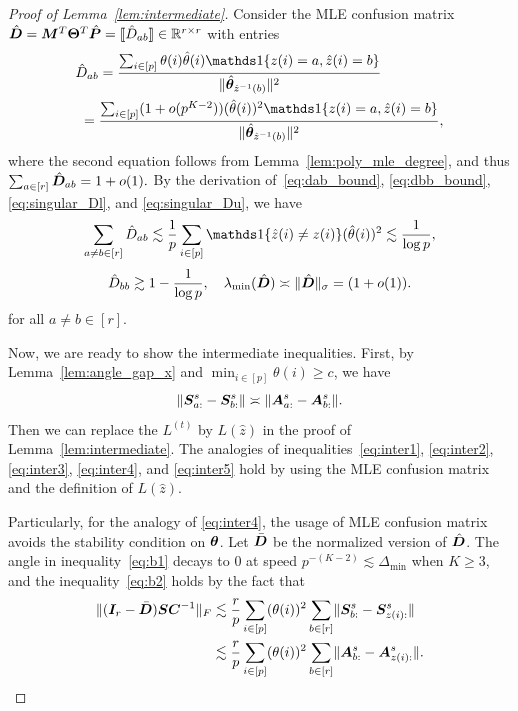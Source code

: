 \documentclass[journal]{IEEEtran}
\theoremstyle{definition}
\theoremstyle{definition}
\begin{document}
\begin{proof}[Proof of Lemma~\ref{lem:intermediate}]
{        Consider the MLE confusion matrix $\hat {\bm{D}} = \bm M^T \boldsymbol{\Theta}^T \hat {\bm{P}} = \llbracket \hat D_{ab} \rrbracket \in \mathbb{R}^{r \times r}$ with entries
        \small
\begin{align}
    &\hat D_{ab}
    = \frac{ \sum_{i \in [p]} \theta(i) \hat \theta(i) \ind\{ z(i) = a, \hat z(i) = b  \} }{\onormSize{}{\hat \mtheta_{\hat z^{-1}(b)}}^2}\\
    &\ = \frac{ \sum_{i \in [p]} (1 + o(p^{K-2}))(\hat \theta(i))^2 \ind\{ z(i) = a, \hat z(i) = b  \} }{\onormSize{}{\hat \mtheta_{\hat z^{-1}(b)}}^2}, \label{eq:mle_confusion}
\end{align}
\normalsize
where the second equation follows from Lemma~\ref{lem:poly_mle_degree}, and thus $\sum_{a \in [r]}\hat {\bm{D}}_{ab} = 1 + o(1).$ By the derivation of~\eqref{eq:dab_bound}, \eqref{eq:dbb_bound}, \eqref{eq:singular_Dl}, and \eqref{eq:singular_Du}, we have 
\begin{equation}
     \sum_{a \neq b \in [r]} \hat D_{ab} \lesssim \frac{1}{p} \sum_{i \in [p]} \ind\{ \hat z(i) \neq z(i) \} (\hat \theta(i))^2 \lesssim \frac{1}{\log p},
\end{equation}
\begin{equation}
     \hat D_{bb} \gtrsim 1- \frac{1}{\log p}, \quad \lambda_{\min}(\hat {\bm{D}}) \asymp \lVert\hat {\bm{D}}\rVert_{\sigma} = (1 + o(1)).
\end{equation}
for all $a \neq b \in [r]$.

Now, we are ready to show the intermediate inequalities. First, by Lemma~\ref{lem:angle_gap_x} and $\min_{ i \in [p]} \theta(i) \geq c$, we have 
\begin{equation}
    \lVert\bm S_{a:}^s - \bm S_{b:}^s\rVert \asymp \lVert\bm A_{a:}^s - \bm A_{b:}^s\rVert.
\end{equation}
Then we can replace the $L^{(t)}$ by $L(\hat z)$ in the proof of Lemma~\ref{lem:intermediate}. The analogies of inequalities~\eqref{eq:inter1}, \eqref{eq:inter2}, \eqref{eq:inter3},  \eqref{eq:inter4}, and \eqref{eq:inter5}  hold by using the MLE confusion matrix and the definition of $L(\hat z)$. 

Particularly, for the analogy of \eqref{eq:inter4}, the usage of MLE confusion matrix avoids the stability condition on $\boldsymbol{\theta}$. Let $\bar {\bm{D}}$ be the normalized version of $\hat {\bm{D}}$. The angle in inequality~\eqref{eq:b1} decays to 0 at speed $p^{-(K-2)} \lesssim \Delta_{\min}$ when $K \geq 3$, and the inequality~\eqref{eq:b2} holds by the fact that 
\begin{align}
    \lVert(\bm I_r - \bar {\bm{D}}) \bm S \bm C^{-1}\rVert_F 
    &\lesssim \frac{r}{p} \sum_{i \in [p]} (\theta(i))^2 \sum_{b \in [r]} \lVert\bm S_{b:}^s - \bm S_{z(i):}^s\rVert \\
    &\lesssim \frac{r}{p} \sum_{i \in [p]} (\theta(i))^2 \sum_{b \in [r]} \lVert\bm A_{b:}^s - \bm A_{z(i):}^s\rVert.
\end{align} 
  }     
       
    \end{proof}
\end{document}

